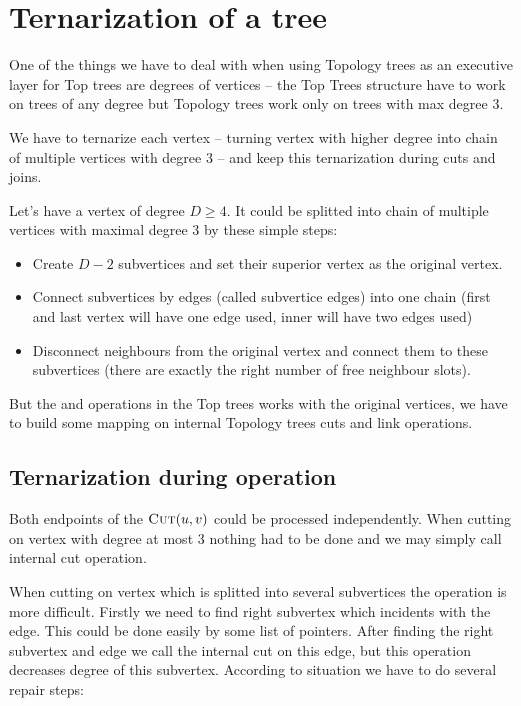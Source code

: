 \section{Ternarization of a tree}

One of the things we have to deal with when using Topology trees as an executive
layer for Top trees are degrees of vertices -- the Top Trees structure have to
work on trees of any degree but Topology trees work only on trees with max
degree 3.

We have to {\I ternarize} each vertex -- turning vertex with higher degree into
chain of multiple vertices with degree 3 -- and keep this ternarization during
cuts and joins.

Let's have a vertex of degree $D\ge4$. It could be splitted into chain of
multiple vertices with maximal degree 3 by these simple steps:
\begin{itemize}
\item Create $D - 2$ {\I subvertices} and set their {\I superior vertex} as the
original vertex.
\item Connect subvertices by edges (called {\I subvertice edges}) into one chain (first
and last vertex will have one edge used, inner will have two edges used)
\item Disconnect neighbours from the original vertex and connect them to these
subvertices (there are exactly the right number of free neighbour slots).
\end{itemize}

But the \Cut{} and \Link{} operations in the Top trees works with the original
vertices, we have to build some mapping on internal Topology trees cuts and link
operations.

\subsection{Ternarization during \Cut{} operation}

Both endpoints of the $\hbox{\sc Cut}(u,v)$ could be processed independently. When cutting on
vertex with degree at most 3 nothing had to be done and we may simply call
internal cut operation.

When cutting on vertex which is splitted into several subvertices the operation
is more difficult. Firstly we need to find right subvertex which incidents with
the edge. This could be done easily by some list of pointers. After finding the
right subvertex and edge we call the internal cut on this edge, but this
operation decreases degree of this subvertex. According to situation we have to
do several repair steps:

